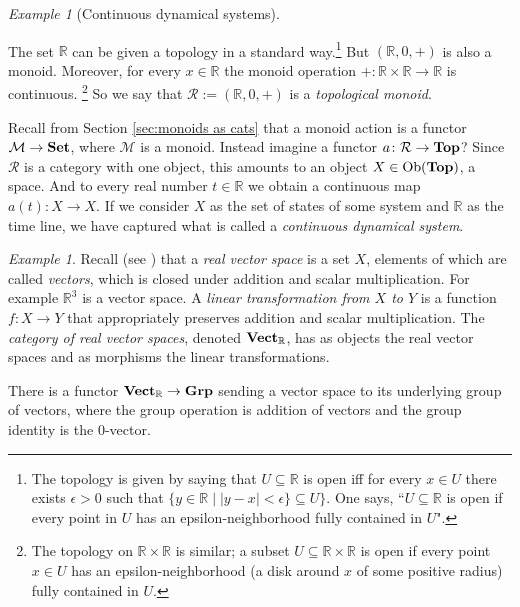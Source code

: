 \documentclass{book}
\def\tn{\textnormal}
\def\mc{\mathcal}
\def\RR{{\mathbb R}}
\def\Ob{\tn{Ob}}
\def\to{\rightarrow}
\def\taking{\colon}
\def\ss{\subseteq}
\def\|{{\;|\;}}
\def\Top{{\bf Top}}
\def\Grp{{\bf Grp}}
\def\Vect{{\bf Vect}}
\def\Set{{\bf Set}}
\def\mcM{\mc{M}}
\def\mcR{\mc{R}}
\theoremstyle{remark}
\newtheorem{example}[subsubsection]{Example}
\theoremstyle{definition}
\begin{document}
\begin{example}[Continuous dynamical systems]\label{ex:continuous dynamical systems}

The set $\RR$ can be given a topology in a standard way.\footnote{The topology is given by saying that $U\ss\RR$ is open iff for every $x\in U$ there exists $\epsilon>0$ such that $\{y\in \RR\| |y-x|<\epsilon\}\ss U\}$. One says, ``$U\ss\RR$ is open if every point in $U$ has an epsilon-neighborhood fully contained in $U$".} But $(\RR,0,+)$ is also a monoid. Moreover, for every $x\in\RR$ the monoid operation $+\taking\RR\times\RR\to\RR$ is continuous.
\footnote{The topology on $\RR\times\RR$ is similar; a subset $U\ss\RR\times\RR$ is open if every point $x\in U$ has an epsilon-neighborhood (a disk around $x$ of some positive radius) fully contained in $U$.}
So we say that $\mcR:=(\RR,0,+)$ is a {\em topological monoid}.

Recall from Section \ref{sec:monoids as cats} that a monoid action is a functor $\mcM\to\Set$, where $\mcM$ is a monoid. Instead imagine a functor $a\taking\mcR\to\Top$? Since $\mcR$ is a category with one object, this amounts to an object $X\in\Ob(\Top)$, a space. And to every real number $t\in\RR$ we obtain a continuous map $a(t)\taking X\to X$. If we consider $X$ as the set of states of some system and $\RR$ as the time line, we have captured what is called a {\em continuous dynamical system}.

\end{example}

\begin{example}\index{a category!$\Vect$}

Recall (see \cite{Axl}) that a {\em real vector space} is a set $X$, elements of which are called {\em vectors}, which is closed under addition and scalar multiplication. For example $\RR^3$ is a vector space. A {\em linear transformation from $X$ to $Y$} is a function $f\taking X\to Y$ that appropriately preserves addition and scalar multiplication. The {\em category of real vector spaces}, denoted $\Vect_\RR$, has as objects the real vector spaces and as morphisms the linear transformations.

There is a functor $\Vect_\RR\to\Grp$\index{a functor!$\Vect_\RR\to\Grp$} sending a vector space to its underlying group of vectors, where the group operation is addition of vectors and the group identity is the 0-vector. 

\end{example}
\end{document}
